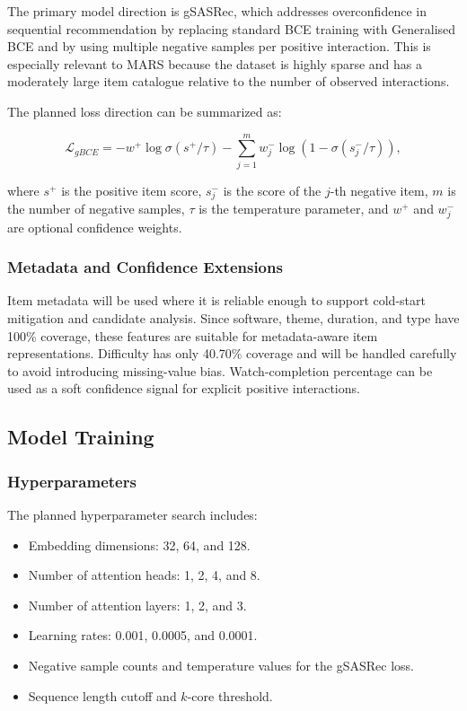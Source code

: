 The primary model direction is gSASRec, which addresses overconfidence in sequential recommendation by replacing standard BCE training with Generalised BCE and by using multiple negative samples per positive interaction. This is especially relevant to MARS because the dataset is highly sparse and has a moderately large item catalogue relative to the number of observed interactions.

The planned loss direction can be summarized as:

\[
\mathcal{L}_{gBCE} = -w^+ \log \sigma(s^+ / \tau) - \sum_{j=1}^{m} w_j^- \log \left(1 - \sigma(s_j^- / \tau)\right),
\]

where $s^+$ is the positive item score, $s_j^-$ is the score of the $j$-th negative item, $m$ is the number of negative samples, $\tau$ is the temperature parameter, and $w^+$ and $w_j^-$ are optional confidence weights.

\subsubsection{Metadata and Confidence Extensions}

Item metadata will be used where it is reliable enough to support cold-start mitigation and candidate analysis. Since software, theme, duration, and type have 100\% coverage, these features are suitable for metadata-aware item representations. Difficulty has only 40.70\% coverage and will be handled carefully to avoid introducing missing-value bias. Watch-completion percentage can be used as a soft confidence signal for explicit positive interactions.

\subsection{Model Training}

\subsubsection{Hyperparameters}

The planned hyperparameter search includes:

\begin{itemize}
    \item Embedding dimensions: 32, 64, and 128.
    \item Number of attention heads: 1, 2, 4, and 8.
    \item Number of attention layers: 1, 2, and 3.
    \item Learning rates: 0.001, 0.0005, and 0.0001.
    \item Negative sample counts and temperature values for the gSASRec loss.
    \item Sequence length cutoff and $k$-core threshold.
\end{itemize}

